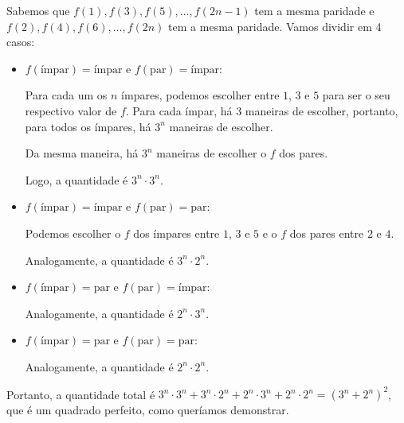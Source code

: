 Sabemos que $f(1), f(3), f(5), \dots, f(2n-1)$ tem a mesma paridade e $f(2), f(4), f(6), \dots, f(2n)$ tem a mesma paridade. Vamos dividir em 4 casos:

\begin{itemize}
	\item $f(\text{ímpar}) = \text{ímpar}$ e $f(\text{par}) = \text{ímpar}$:

		Para cada um os $n$ ímpares, podemos escolher entre $1$, $3$ e $5$ para ser o seu respectivo valor de $f$. Para cada ímpar, há $3$ maneiras de escolher, portanto, para todos os ímpares, há $3^n$ maneiras de escolher.

		Da mesma maneira, há $3^n$ maneiras de escolher o $f$ dos pares.
	
		Logo, a quantidade é $3^n \cdot 3^n$.

	\item $f(\text{ímpar}) = \text{ímpar}$ e $f(\text{par}) = \text{par}$:

		Podemos escolher o $f$ dos ímpares entre $1$, $3$ e $5$ e o $f$ dos pares entre $2$ e $4$.

		Analogamente, a quantidade é $3^n \cdot 2^n$.

	\item $f(\text{ímpar}) = \text{par}$ e $f(\text{par}) = \text{ímpar}$:

		Analogamente, a quantidade é $2^n \cdot 3^n$.

	\item $f(\text{ímpar}) = \text{par}$ e $f(\text{par}) = \text{par}$:

		Analogamente, a quantidade é $2^n \cdot 2^n$.
\end{itemize}

Portanto, a quantidade total é $3^n \cdot 3^n + 3^n \cdot 2^n + 2^n \cdot 3^n + 2^n \cdot 2^n = (3^n + 2^n)^2$, que é um quadrado perfeito, como queríamos demonstrar.
